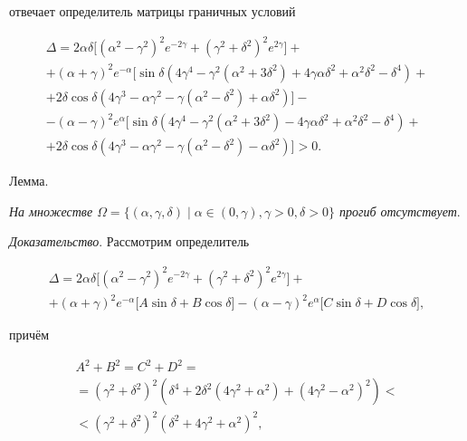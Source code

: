 отвечает определитель матрицы граничных условий

\begin{multline*}

\Delta=2\alpha\delta\big[ (\alpha^2-\gamma^2)^2e^{-2\gamma}+(\gamma^2+\delta^2)^2e^{2\gamma} \big]+\\ +(\alpha+\gamma)^2 e^{-\alpha}\Big [ \sin\delta (4\gamma^4-\gamma^2(\alpha^2+3\delta^2)+4\gamma\alpha\delta^2+\alpha^2\delta^2-\delta^4)+\\

+ 2\delta\cos\delta (4\gamma^3-\alpha\gamma^2-\gamma(\alpha^2-\delta^2)+\alpha\delta^2)\Big]-\\ -(\alpha-\gamma)^2 e^{\alpha}\Big[ \sin\delta(4\gamma^4-\gamma^2(\alpha^2+3\delta^2)-4\gamma\alpha\delta^2+\alpha^2\delta^2-\delta^4)+\\

+ 2\delta\cos\delta(4\gamma^3-\alpha\gamma^2-\gamma(\alpha^2-\delta^2)-\alpha\delta^2)\Big]>0.

\end{multline*}





\smallskip 



{\small \sc Лемма.}

{\it На множестве $\Omega=\{(\alpha,\gamma,\delta) \mid \alpha\in(0,\gamma),\gamma>0, \delta>0\}$ прогиб отсутствует}.





\smallskip 



\textit{Доказательство}. Рассмотрим определитель 

\begin{multline*}

\Delta=2\alpha\delta\bigl[ (\alpha^2-\gamma^2)^2e^{-2\gamma}+(\gamma^2+\delta^2)^2e^{2\gamma} \bigr]+

\\

+(\alpha+\gamma)^2 e^{-\alpha} \bigl[A \sin\delta + B\cos\delta \bigr]-(\alpha-\gamma)^2 e^{\alpha}\bigl[ C\sin\delta+D\cos\delta\bigr],

\end{multline*}

 причём

 \begin{multline*} 

 A^2+B^2=C^2+D^2 =

 \\ =(\gamma^2+\delta^2)^2(\delta^4+2\delta^2(4\gamma^2+\alpha^2)+(4\gamma^2-\alpha^2)^2)<\\ <(\gamma^2+\delta^2)^2 (\delta^2+4\gamma^2+\alpha^2)^2,

\end{multline*} 

